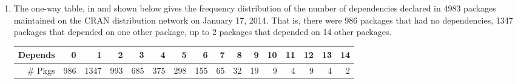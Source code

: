 \documentclass[11pt]{book}\usepackage[]{graphicx}\usepackage[]{color}
\begin{document}
\begin{enumerate}
\item \hard
  The one-way table,  in  and shown below gives the frequency
  distribution of the number of dependencies declared in 4983 \R packages
  maintained on the CRAN distribution network on January 17, 2014. That is, there were 986
  packages that had no dependencies, 1347 packages that depended on one other package, 
  up to 2 packages that depended on 14 other packages.

\begin{table}[ht]
\centering
\begin{tabular}{rrrrrrrrrrrrrrrr}
  \hline
Depends & 0 & 1 & 2 & 3 & 4 & 5 & 6 & 7 & 8 & 9 & 10 & 11 & 12 & 13 & 14 \\ 
  \hline
# Pkgs & 986 & 1347 & 993 & 685 & 375 & 298 & 155 &  65 &  32 &  19 &   9 &   4 &   9 &   4 &   2 \\ 
   \hline
\end{tabular}
\end{table}


\end{enumerate}
\end{document}

